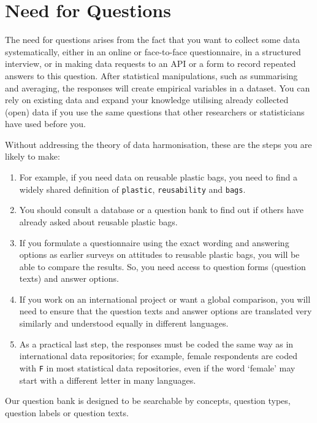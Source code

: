 \documentclass[
  letterpaper,
  DIV=11,
  numbers=noendperiod]{scrreprt}
\providecommand{\tightlist}{%
  \setlength{\itemsep}{0pt}\setlength{\parskip}{0pt}}\usepackage{longtable,booktabs,array}
\begin{document}
\section{Need for Questions}\label{need-for-questions}

The need for questions arises from the fact that you want to collect
some data systematically, either in an online or face-to-face
questionnaire, in a structured interview, or in making data requests to
an API or a form to record repeated answers to this question. After
statistical manipulations, such as summarising and averaging, the
responses will create empirical variables in a dataset. You can rely on
existing data and expand your knowledge utilising already collected
(open) data if you use the same questions that other researchers or
statisticians have used before you.

Without addressing the theory of data harmonisation, these are the steps
you are likely to make:

\begin{enumerate}
\def\labelenumi{\arabic{enumi}.}
\tightlist
\item
  For example, if you need data on reusable plastic bags, you need to
  find a widely shared definition of \texttt{plastic},
  \texttt{reusability} and \texttt{bags}.
\item
  You should consult a database or a question bank to find out if others
  have already asked about reusable plastic bags.
\item
  If you formulate a questionnaire using the exact wording and answering
  options as earlier surveys on attitudes to reusable plastic bags, you
  will be able to compare the results. So, you need access to question
  forms (question texts) and answer options.
\item
  If you work on an international project or want a global comparison,
  you will need to ensure that the question texts and answer options are
  translated very similarly and understood equally in different
  languages.
\item
  As a practical last step, the responses must be coded the same way as
  in international data repositories; for example, female respondents
  are coded with \texttt{F} in most statistical data repositories, even
  if the word `female' may start with a different letter in many
  languages.
\end{enumerate}

Our question bank is designed to be searchable by concepts, question
types, question labels or question texts.
\end{document}

